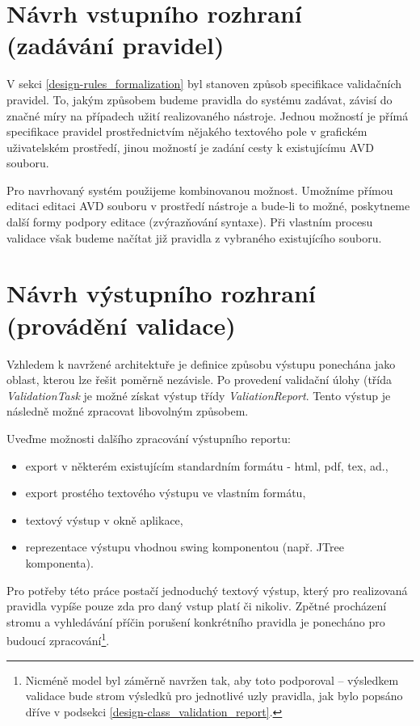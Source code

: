 \section{Návrh vstupního rozhraní (zadávání pravidel)}
V sekci \ref{design-rules_formalization} byl stanoven způsob specifikace validačních pravidel. To, jakým způsobem budeme pravidla do systému zadávat, závisí do značné míry na případech užití realizovaného nástroje. Jednou možností je přímá specifikace pravidel prostřednictvím nějakého textového pole v grafickém uživatelském prostředí, jinou možností je zadání cesty k existujícímu AVD souboru.

Pro navrhovaný systém použijeme kombinovanou možnost. Umožníme přímou editaci editaci AVD souboru v prostředí nástroje a bude-li to možné, poskytneme další formy podpory editace (zvýrazňování syntaxe). Při vlastním procesu validace však budeme načítat již pravidla z vybraného existujícího souboru.

\section{Návrh výstupního rozhraní (provádění validace)}

Vzhledem k navržené architektuře je definice způsobu výstupu ponechána jako oblast, kterou lze řešit poměrně nezávisle. Po provedení validační úlohy (třída \emph{ValidationTask} je možné získat výstup třídy \emph{ValiationReport}. Tento výstup je následně možné zpracovat libovolným způsobem.

Uveďme možnosti dalšího zpracování výstupního reportu:

\begin{itemize}
\item export v některém existujícím standardním formátu - html, pdf, tex, ad.,
\item export prostého textového výstupu ve vlastním formátu,
\item textový výstup v okně aplikace,
\item reprezentace výstupu vhodnou swing komponentou (např. JTree komponenta).
\end{itemize}

Pro potřeby této práce postačí jednoduchý textový výstup, který pro realizovaná pravidla vypíše pouze zda pro daný vstup platí či nikoliv. Zpětné procházení stromu a vyhledávání příčin porušení konkrétního pravidla je ponecháno pro budoucí zpracování\footnote{Nicméně model byl záměrně navržen tak, aby toto podporoval -- výsledkem validace bude strom výsledků pro jednotlivé uzly pravidla, jak bylo popsáno dříve v podsekci \ref{design-class_validation_report}.}.

